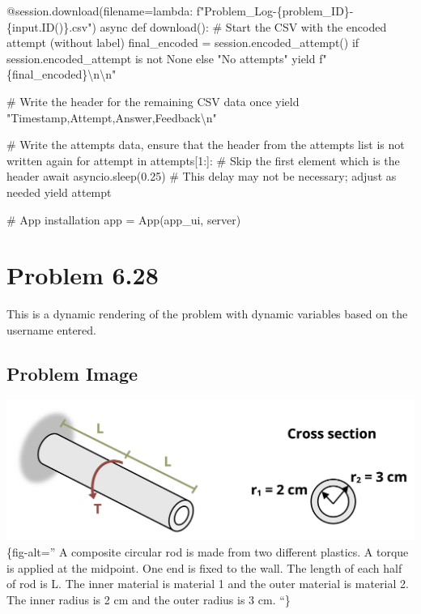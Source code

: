 \documentclass[
  letterpaper,
  DIV=11,
  numbers=noendperiod]{scrreprt}
\newenvironment{Shaded}{\begin{snugshade}}{\end{snugshade}}
\newcommand{\NormalTok}[1]{\textcolor[rgb]{0.00,0.23,0.31}{#1}}
\begin{document}
\begin{Shaded}
\begin{Highlighting}[]
\NormalTok{    @session.download(filename=lambda: f"Problem\_Log{-}\{problem\_ID\}{-}\{input.ID()\}.csv")}
\NormalTok{    async def download():}
\NormalTok{        \# Start the CSV with the encoded attempt (without label)}
\NormalTok{        final\_encoded = session.encoded\_attempt() if session.encoded\_attempt is not None else "No attempts"}
\NormalTok{        yield f"\{final\_encoded\}\textbackslash{}n\textbackslash{}n"}
        
\NormalTok{        \# Write the header for the remaining CSV data once}
\NormalTok{        yield "Timestamp,Attempt,Answer,Feedback\textbackslash{}n"}
        
\NormalTok{        \# Write the attempts data, ensure that the header from the attempts list is not written again}
\NormalTok{        for attempt in attempts[1:]:  \# Skip the first element which is the header}
\NormalTok{            await asyncio.sleep(0.25)  \# This delay may not be necessary; adjust as needed}
\NormalTok{            yield attempt}


\NormalTok{\# App installation}
\NormalTok{app = App(app\_ui, server)}
\end{Highlighting}
\end{Shaded}

\chapter*{Problem 6.28}\label{problem-6.28}


This is a dynamic rendering of the problem with dynamic variables based
on the username entered.

\section*{Problem Image}\label{problem-image-70}


\includegraphics{images/288.png}\{fig-alt='' A composite circular rod is
made from two different plastics. A torque is applied at the midpoint.
One end is fixed to the wall. The length of each half of rod is L. The
inner material is material 1 and the outer material is material 2. The
inner radius is 2 cm and the outer radius is 3 cm. ``\}
\end{document}
